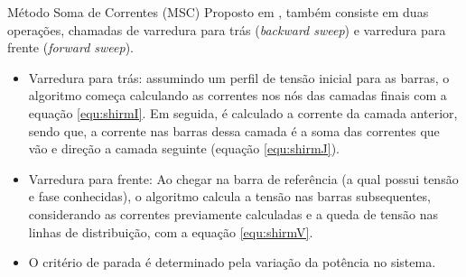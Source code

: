 \documentclass[10pt]{beamer}
\begin{document}
\begin{frame}{Método Soma de Correntes (MSC)}
    Proposto em \cite{ShirmohammadiMono, Shirmohammadi3F}, também consiste em duas operações, chamadas de varredura para trás (\textit{backward sweep}) e varredura para frente (\textit{forward sweep}). 
    
    \begin{itemize}
        \item Varredura para trás: assumindo um perfil de tensão inicial para as barras, o algoritmo começa calculando as correntes nos nós das camadas finais com a equação \ref{equ:shirmI}. Em seguida, é calculado a corrente da camada anterior, sendo que, a corrente nas barras dessa camada é a soma das correntes que vão e direção a camada seguinte (equação \ref{equ:shirmJ}).
        
        \item Varredura para frente: Ao chegar na barra de referência (a qual possui tensão e fase conhecidas), o algoritmo calcula a tensão nas barras subsequentes, considerando as correntes previamente calculadas e a queda de tensão nas linhas de distribuição, com a equação \ref{equ:shirmV}.
        
        \item O critério de parada é determinado pela variação da potência no sistema.
    \end{itemize}
\end{frame}
\end{document}
